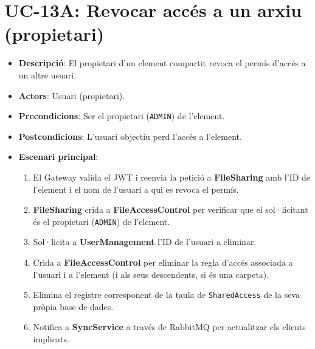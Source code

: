 \section{UC-13A: Revocar accés a un arxiu (propietari)}
\begin{itemize}
    \item \textbf{Descripció}: El propietari d'un element compartit revoca el permís d'accés a un altre usuari.
    \item \textbf{Actors}: Usuari (propietari).
    \item \textbf{Precondicions}: Ser el propietari (\texttt{ADMIN}) de l'element.
    \item \textbf{Postcondicions}: L'usuari objectiu perd l'accés a l'element.
    \item \textbf{Escenari principal}:
    \begin{enumerate}
        \item El Gateway valida el JWT i reenvia la petició a \textbf{FileSharing} amb l'ID de l'element i el nom de l'usuari a qui es revoca el permís.
        \item \textbf{FileSharing} crida a \textbf{FileAccessControl} per verificar que el sol·licitant és el propietari (\texttt{ADMIN}) de l'element.
        \item Sol·licita a \textbf{UserManagement} l'ID de l'usuari a eliminar.
        \item Crida a \textbf{FileAccessControl} per eliminar la regla d'accés associada a l'usuari i a l'element (i als seus descendents, si és una carpeta).
        \item Elimina el registre corresponent de la taula de \texttt{SharedAccess} de la seva pròpia base de dades.
        \item Notifica a \textbf{SyncService} a través de RabbitMQ per actualitzar els clients implicats.
    \end{enumerate}
\end{itemize}

